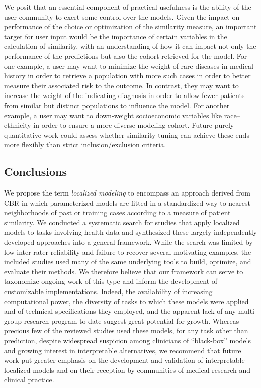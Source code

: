\documentclass[preprint, 3p,
authoryear]{elsarticle} %
\begin{document}
We posit that an essential component of practical usefulness is the
ability of the user community to exert some control over the models.
Given the impact on performance of the choice or optimization of the
similarity measure, an important target for user input would be the
importance of certain variables in the calculation of similarity, with
an understanding of how it can impact not only the performance of the
predictions but also the cohort retrieved for the model. For one
example, a user may want to minimize the weight of rare diseases in
medical history in order to retrieve a population with more such cases
in order to better measure their associated risk to the outcome. In
contrast, they may want to increase the weight of the indicating
diagnosis in order to allow fewer patients from similar but distinct
populations to influence the model. For another example, a user may want
to down-weight socioeconomic variables like race--ethnicity in order to
ensure a more diverse modeling cohort. Future purely quantitative work
could assess whether similarity-tuning can achieve these ends more
flexibly than strict inclusion/exclusion criteria.

\hypertarget{conclusions}{%
\subsection{Conclusions}\label{conclusions}}

We propose the term \emph{localized modeling} to encompass an approach
derived from CBR in which parameterized models are fitted in a
standardized way to nearest neighborhoods of past or training cases
according to a measure of patient similarity. We conducted a systematic
search for studies that apply localized models to tasks involving health
data and synthesized these largely independently developed approaches
into a general framework. While the search was limited by low
inter-rater reliability and failure to recover several motivating
examples, the included studies used many of the same underlying tools to
build, optimize, and evaluate their methods. We therefore believe that
our framework can serve to taxonomize ongoing work of this type and
inform the development of customizable implementations. Indeed, the
availability of increasing computational power, the diversity of tasks
to which these models were applied and of technical specifications they
employed, and the apparent lack of any multi-group research program to
date suggest great potential for growth. Whereas precious few of the
reviewed studies used these models, for any task other than prediction,
despite widespread suspicion among clinicians of ``black-box'' models
and growing interest in interpretable alternatives, we recommend that
future work put greater emphasis on the development and validation of
interpretable localized models and on their reception by communities of
medical research and clinical practice.
\end{document}
